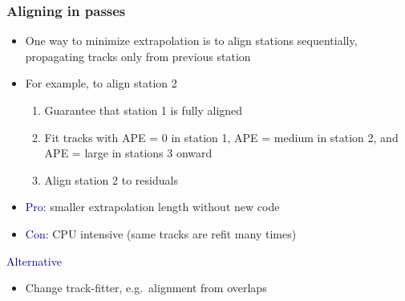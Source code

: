 \documentclass[compress]{beamer}
\begin{document}
\begin{frame}
\frametitle{Aligning in passes}

\begin{itemize}\setlength{\itemsep}{0.25 cm}
\item One way to minimize extrapolation is to align stations
sequentially, propagating tracks only from previous station
\item For example, to align station 2
\begin{enumerate}\setlength{\itemsep}{0.1 cm}
\item Guarantee that station 1 is fully aligned
\item Fit tracks with APE = 0 in station 1, APE = medium in station 2, and APE = large in stations 3 onward
\item Align station 2 to residuals
\end{enumerate}

\item \textcolor{darkblue}{Pro:} smaller extrapolation length without new code

\item \textcolor{darkblue}{Con:} CPU intensive (same tracks are refit many times)
\end{itemize}

\vspace{0.3 cm}
\hspace{-0.83 cm} \textcolor{darkblue}{\Large Alternative}

\begin{itemize}
\item Change track-fitter, e.g.\ alignment from overlaps
\end{itemize}
\end{frame}
\end{document}
